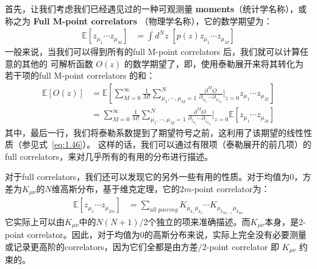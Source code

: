 首先，让我们考虑我们已经遇见过的一种可观测量 \textbf{moments}（统计学名称），或称之为 \textbf{Full M-point correlators} （物理学名称），它的数学期望为：
\begin{equation}
    \begin{split}
        \mathbb{E}[z_{\mu_1}\cdots z_{\mu_M}] 
        &= \int d^N\!z\;[p(z)z_{\mu_1}\cdots z_{\mu_M}]
    \end{split}
\end{equation}
一般来说，当我们可以得到所有的full M-point correlators 后，我们就可以计算任意的其他的 可解析函数 $O(z)$ 的数学期望了，即，使用泰勒展开来将其转化为 若干项的full M-point correlators 的和：
\begin{equation}
    \begin{split}
        \mathbb{E}[O(z)] 
        &= \mathbb{E} \left[
            \sum_{M=0}^{\infty}{\frac{1}{M!}\sum_{\mu_1,\cdots,\mu_M=1}^N{
                \frac{\partial^M O}{\partial_{z_{\mu_1}}\cdots \partial_{z_{\mu_M}}} \bigg |_{z=0} z_{\mu_1}\cdots z_{\mu_M}
            }}
        \right] \\
        &= \sum_{M=0}^{\infty}{
            \frac{1}{M!} \sum_{\mu_1,\cdots,\mu_M=1}^N{
                \frac{\partial^M O}{\partial_{z_{\mu_1}}\cdots \partial_{z_{\mu_M}}} \bigg |_{z=0} \mathbb{E}[z_{\mu_1}\cdots z_{\mu_M}]
            }
        }
    \end{split}
\end{equation}
其中，最后一行，我们将泰勒系数提到了期望符号之前，这利用了该期望的线性性质（参见式~\eqref{eq:1.46}）。
这样的话，我们可以通过有限项（泰勒展开的前几项）的full correlators，来对几乎所有的有用的分布进行描述。

对于full correlators，我们还可以发现它的另外一些有用的性质。对于均值为$0$，方差为$K_{\mu\nu}$的$N$维高斯分布，基于维克定理，它的$2m$-point correlator为：
\begin{equation}
    \begin{split}
        \label{eq:1.50}
        \mathbb{E}[z_{\mu_1}\cdots z_{\mu_{2m}}] 
        &= \sum_{all\;pairing}{
            K_{\mu_{k_1}\mu_{k_2}} \cdots K_{\mu_{k_{2m-1}}\mu_{k_{2m}}}
        }
    \end{split}
\end{equation}
它实际上可以由$K_{\mu\nu}$中的$N(N+1)/2$个独立的项来准确描述。而$K_{\mu\nu}$本身，是$2$-point correlator。因此，对于均值为$0$的高斯分布来说，实际上完全没有必要测量或记录更高阶的correlators，因为它们全都是由方差/$2$-point correlator 即 $K_{\mu\nu}$ 约束的。


